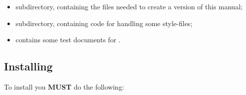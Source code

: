 \begin{itemize}
\item {} subdirectory, containing the files needed to create 
a version of this manual;
\item {} subdirectory, containing \Perl{} code for handling
some style-files;
\item {} contains some test documents for \latextohtml.
\end{itemize}

\htmlrule
\tableofchildlinks

\subsection{Installing \protect\latextohtml}%
\html{\\}%
To install \latextohtml{} you \textbf{MUST} do the following:
%
